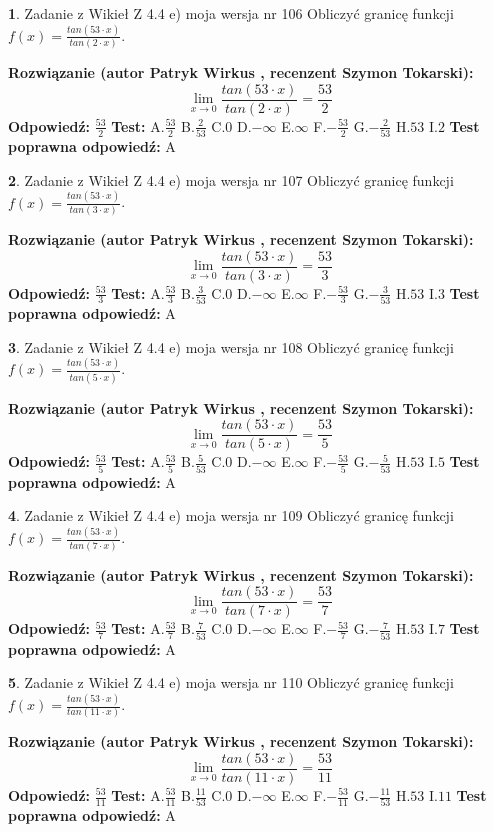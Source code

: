 \documentclass[12pt, a4paper]{article}
\theoremstyle{definition} %
\newtheorem{zad}{}
\newcommand{\zadStart}[1]{\begin{zad}#1\newline}
\newcommand{\zadStop}{\end{zad}}
\newcommand{\rozwStart}[2]{\noindent \textbf{Rozwiązanie (autor #1 , recenzent #2): }\newline}
\newcommand{\rozwStop}{\newline}
\newcommand{\odpStart}{\noindent \textbf{Odpowiedź:}\newline}
\newcommand{\odpStop}{\newline}
\newcommand{\testStart}{\noindent \textbf{Test:}\newline}
\newcommand{\testStop}{\newline}
\newcommand{\kluczStart}{\noindent \textbf{Test poprawna odpowiedź:}\newline}
\newcommand{\kluczStop}{\newline}
\begin{document}
\zadStart{Zadanie z Wikieł Z 4.4 e) moja wersja nr 106}
Obliczyć granicę funkcji $f(x)=\frac{tan(53\cdot x)}{tan(2\cdot x)}$.
\zadStop
\rozwStart{Patryk Wirkus}{Szymon Tokarski}
$$\lim\limits_{x\to 0}\frac{tan(53\cdot x)}{tan(2\cdot x)}=
\frac{53}{2}$$
\rozwStop
\odpStart
$\frac{53}{2}$
\odpStop
\testStart
A.$\frac{53}{2}$
B.$\frac{2}{53}$
C.$0$
D.$-\infty$
E.$\infty$
F.$-\frac{53}{2}$
G.$-\frac{2}{53}$
H.$53$
I.$2$
\testStop
\kluczStart
A
\kluczStop



\zadStart{Zadanie z Wikieł Z 4.4 e) moja wersja nr 107}
Obliczyć granicę funkcji $f(x)=\frac{tan(53\cdot x)}{tan(3\cdot x)}$.
\zadStop
\rozwStart{Patryk Wirkus}{Szymon Tokarski}
$$\lim\limits_{x\to 0}\frac{tan(53\cdot x)}{tan(3\cdot x)}=
\frac{53}{3}$$
\rozwStop
\odpStart
$\frac{53}{3}$
\odpStop
\testStart
A.$\frac{53}{3}$
B.$\frac{3}{53}$
C.$0$
D.$-\infty$
E.$\infty$
F.$-\frac{53}{3}$
G.$-\frac{3}{53}$
H.$53$
I.$3$
\testStop
\kluczStart
A
\kluczStop



\zadStart{Zadanie z Wikieł Z 4.4 e) moja wersja nr 108}
Obliczyć granicę funkcji $f(x)=\frac{tan(53\cdot x)}{tan(5\cdot x)}$.
\zadStop
\rozwStart{Patryk Wirkus}{Szymon Tokarski}
$$\lim\limits_{x\to 0}\frac{tan(53\cdot x)}{tan(5\cdot x)}=
\frac{53}{5}$$
\rozwStop
\odpStart
$\frac{53}{5}$
\odpStop
\testStart
A.$\frac{53}{5}$
B.$\frac{5}{53}$
C.$0$
D.$-\infty$
E.$\infty$
F.$-\frac{53}{5}$
G.$-\frac{5}{53}$
H.$53$
I.$5$
\testStop
\kluczStart
A
\kluczStop



\zadStart{Zadanie z Wikieł Z 4.4 e) moja wersja nr 109}
Obliczyć granicę funkcji $f(x)=\frac{tan(53\cdot x)}{tan(7\cdot x)}$.
\zadStop
\rozwStart{Patryk Wirkus}{Szymon Tokarski}
$$\lim\limits_{x\to 0}\frac{tan(53\cdot x)}{tan(7\cdot x)}=
\frac{53}{7}$$
\rozwStop
\odpStart
$\frac{53}{7}$
\odpStop
\testStart
A.$\frac{53}{7}$
B.$\frac{7}{53}$
C.$0$
D.$-\infty$
E.$\infty$
F.$-\frac{53}{7}$
G.$-\frac{7}{53}$
H.$53$
I.$7$
\testStop
\kluczStart
A
\kluczStop



\zadStart{Zadanie z Wikieł Z 4.4 e) moja wersja nr 110}
Obliczyć granicę funkcji $f(x)=\frac{tan(53\cdot x)}{tan(11\cdot x)}$.
\zadStop
\rozwStart{Patryk Wirkus}{Szymon Tokarski}
$$\lim\limits_{x\to 0}\frac{tan(53\cdot x)}{tan(11\cdot x)}=
\frac{53}{11}$$
\rozwStop
\odpStart
$\frac{53}{11}$
\odpStop
\testStart
A.$\frac{53}{11}$
B.$\frac{11}{53}$
C.$0$
D.$-\infty$
E.$\infty$
F.$-\frac{53}{11}$
G.$-\frac{11}{53}$
H.$53$
I.$11$
\testStop
\kluczStart
A
\kluczStop
\end{document}
